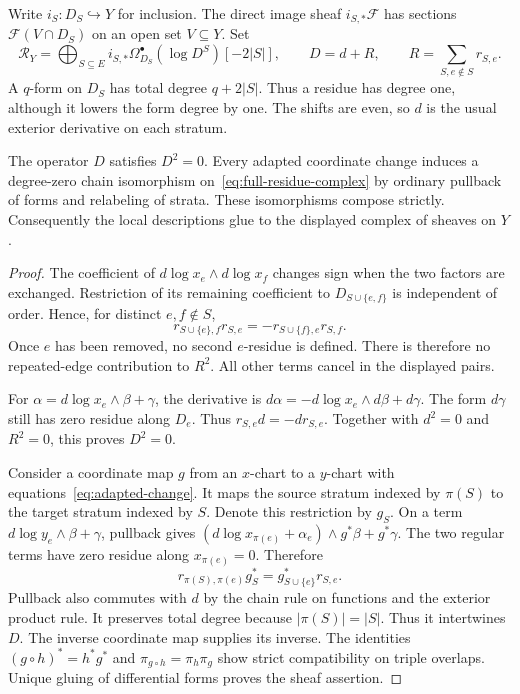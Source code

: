 Write $i_S:D_S\hookrightarrow Y$ for inclusion.
The direct image sheaf $i_{S,*}\mathcal F$ has sections
$\mathcal F(V\cap D_S)$ on an open set $V\subseteq Y$.
Set
\begin{equation}
\label{eq:full-residue-complex}
\mathcal R_Y=
\bigoplus_{S\subseteq E}i_{S,*}\Omega^\bullet_{D_S}(\log D^S)[-2|S|],
\qquad D=d+R,\qquad R=\sum_{S,e\notin S}r_{S,e}.
\end{equation}
A $q$-form on $D_S$ has total degree $q+2|S|$.
Thus a residue has degree one, although it lowers the form degree by one.
The shifts are even, so $d$ is the usual exterior derivative on each stratum.

\begin{proposition}
\label{prop:strict-residue-descent}
The operator $D$ satisfies $D^2=0$.
Every adapted coordinate change induces a degree-zero chain isomorphism on~\eqref{eq:full-residue-complex} by ordinary pullback of forms and relabeling of strata.
These isomorphisms compose strictly.
Consequently the local descriptions glue to the displayed complex of sheaves on $Y$.
\end{proposition}

\begin{proof}
The coefficient of $d\log x_e\wedge d\log x_f$ changes sign when the two factors are exchanged.
Restriction of its remaining coefficient to $D_{S\cup\{e,f\}}$ is independent of order.
Hence, for distinct $e,f\notin S$,
\[
r_{S\cup\{e\},f}r_{S,e}
=-r_{S\cup\{f\},e}r_{S,f}.
\]
Once $e$ has been removed, no second $e$-residue is defined.
There is therefore no repeated-edge contribution to $R^2$.
All other terms cancel in the displayed pairs.

For $\alpha=d\log x_e\wedge\beta+\gamma$, the derivative is
$d\alpha=-d\log x_e\wedge d\beta+d\gamma$.
The form $d\gamma$ still has zero residue along $D_e$.
Thus $r_{S,e}d=-dr_{S,e}$.
Together with $d^2=0$ and $R^2=0$, this proves $D^2=0$.

Consider a coordinate map $g$ from an $x$-chart to a $y$-chart with equations~\eqref{eq:adapted-change}.
It maps the source stratum indexed by $\pi(S)$ to the target stratum indexed by $S$.
Denote this restriction by $g_S$.
On a term $d\log y_e\wedge\beta+\gamma$, pullback gives
$(d\log x_{\pi(e)}+\alpha_e)\wedge g^*\beta+g^*\gamma$.
The two regular terms have zero residue along $x_{\pi(e)}=0$.
Therefore
\begin{equation}
\label{eq:pullback-residue}
r_{\pi(S),\pi(e)}g_S^*=g_{S\cup\{e\}}^*r_{S,e}.
\end{equation}
Pullback also commutes with $d$ by the chain rule on functions and the exterior product rule.
It preserves total degree because $|\pi(S)|=|S|$.
Thus it intertwines $D$.
The inverse coordinate map supplies its inverse.
The identities $(g\circ h)^*=h^*g^*$ and $\pi_{g\circ h}=\pi_h\pi_g$
show strict compatibility on triple overlaps.
Unique gluing of differential forms proves the sheaf assertion.
\end{proof}

